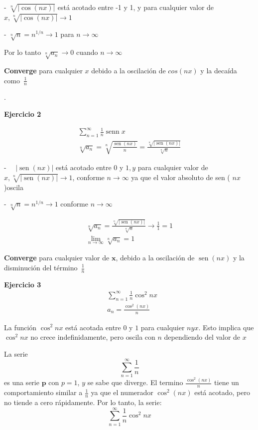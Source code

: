 \documentclass{article}
\begin{document}
\begin{enumerate}
- $\sqrt[n]{|\cos (n x)|}$ está acotado entre -1 y 1, y para cualquier valor de $x, \sqrt[n]{|\cos (n x)|} \rightarrow 1$

- $\sqrt[n]{n}=n^{1 / n} \rightarrow 1$ para $n \rightarrow \infty$

Por lo tanto $\sqrt[n]{a_n} \rightarrow 0$ cuando $n \rightarrow \infty$

\textbf{Converge} para cualquier $x$ debido a la oscilación de $cos(nx)$ y la decaída como $\frac{1}{n}$

.

\textbf{Ejercicio 2}

$$
\begin{gathered}
\sum_{n=1}^{\infty} \frac{1}{n} \operatorname{senn} x \\
\sqrt[n]{a_n}=\sqrt[n]{\frac{\operatorname{sen}(n x)}{n}}=\frac{\sqrt[n]{|\operatorname{sen}(n x)|}}{\sqrt[n]{n}}
\end{gathered}
$$

- $\quad|\operatorname{sen}(n x)|$ está acotado entre 0 y $1, y$ para cualquier valor de $x, \sqrt[n]{|\operatorname{sen}(n x)|} \rightarrow 1$, conforme $n \rightarrow \infty$ ya que el valor absoluto de sen ( $n x$ )oscila

- $\sqrt[n]{n}=n^{1 / n} \rightarrow 1$ conforme $n \rightarrow \infty$

$$
\begin{gathered}
\sqrt[n]{a_n}=\frac{\sqrt[n]{|\operatorname{sen}(n x)|}}{\sqrt[n]{n}} \rightarrow \frac{1}{1}=1 \\
\lim _{n \rightarrow \infty} \sqrt[n]{a_n}=1
\end{gathered}
$$

\textbf{Converge} para cualquier valor de $\boldsymbol{x}$, debido a la oscilación de $\operatorname{sen}(n x)$ y la disminución del término $\frac{1}{n}$

\newpage
\textbf{Ejercicio 3}
$$
\begin{aligned}
& \sum_{n=1}^{\infty} \frac{1}{n} \cos ^2 n x \\
& a_n=\frac{\cos ^2(n x)}{n}
\end{aligned}
$$

La función $\cos ^2 n x$ está acotada entre $0$ y $1$ para cualquier $n y x$. Esto implica que $\cos ^2 n x$ no crece indefinidamente, pero oscila con $n$ dependiendo del valor de $x$

La serie
$$
\sum_{n=1}^{\infty} \frac{1}{n}
$$
es una serie $\mathbf{p}$ con $p=1$, $y$ se sabe que diverge.
El termino $\frac{\cos ^2(n x)}{n}$ tiene un comportamiento similar a $\frac{1}{n}$ ya que el numerador $\cos ^2(n x)$ está acotado, pero no tiende a cero rápidamente. Por lo tanto, la serie:
$$
\sum_{n=1}^{\infty} \frac{1}{n} \cos ^2 n x
$$


\end{enumerate}
\end{document}
